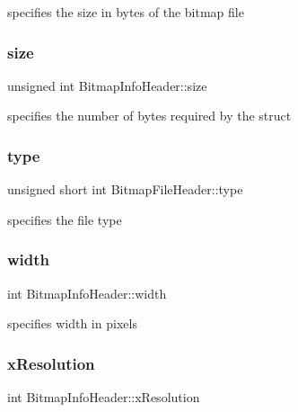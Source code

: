 specifies the size in bytes of the bitmap file 

\mbox{\label{group__bitmap_ga411fa70f6547a0360b33edcd3273d169}} 
\subsubsection{\texorpdfstring{size}{size}\hspace{0.1cm}{\footnotesize\ttfamily [2/2]}}
{\footnotesize\ttfamily unsigned int Bitmap\+Info\+Header\+::size}



specifies the number of bytes required by the struct 

\mbox{\label{group__bitmap_ga0206e64e29930b0594e714cbdf8090f0}} 
\subsubsection{\texorpdfstring{type}{type}}
{\footnotesize\ttfamily unsigned short int Bitmap\+File\+Header\+::type}



specifies the file type 

\mbox{\label{group__bitmap_gac2034cfbada460819beed1ee24581c5d}} 
\subsubsection{\texorpdfstring{width}{width}}
{\footnotesize\ttfamily int Bitmap\+Info\+Header\+::width}



specifies width in pixels 

\mbox{\label{group__bitmap_ga391cf1da75d16aee3b6539ccf5b29300}} 
\subsubsection{\texorpdfstring{x\+Resolution}{xResolution}}
{\footnotesize\ttfamily int Bitmap\+Info\+Header\+::x\+Resolution}



